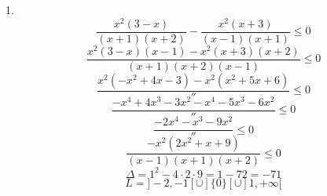 \documentclass{article}
\begin{document}
1.
\[ \frac{x^2(3-x)}{(x+1)(x+2)} - \frac{x^2(x+3)}{(x-1)(x+1)} \le 0 \]
\[ \frac{x^2(3-x)(x-1) - x^2(x+3)(x+2)}{(x+1)(x+2)(x-1)} \le 0 \]
\[ \frac{x^2(-x^2+4x-3) - x^2(x^2+5x+6)}{''} \le 0 \]
\[ \frac{-x^4+4x^3-3x^2-x^4-5x^3-6x^2}{''} \le 0 \]
\[ \frac{-2x^4-x^3-9x^2}{''} \le 0 \]
\[ \frac{-x^2(2x^2 + x + 9)}{(x-1)(x+1)(x+2)} \le 0 \]
\[ \Delta = 1^2 - 4 \cdot 2 \cdot 9 = 1 - 72 = -71 \]
\[ L = ] -2, -1 [ \cup ] \{0\} [ \cup ] 1, +\infty [ \]
\end{document}
